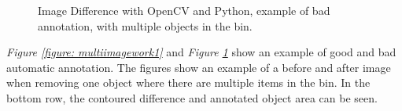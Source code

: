 \begin{figure}[ht]
 \centering
 \hspace{0.5cm}
 \hspace{0.5cm}
 \hspace{0.5cm}
 \caption{Image Difference with OpenCV and Python, example of bad annotation, with multiple objects in the bin.}
 \label{figure: multiimagework2}
\end{figure}

\textit{Figure \ref{figure: multiimagework1}} and \textit{Figure \ref{figure: multiimagework2}} show an example of good and bad automatic annotation. The figures show an example of a before and after image when removing one object where there are multiple items in the bin. In the bottom row, the contoured difference and annotated object area can be seen. %

